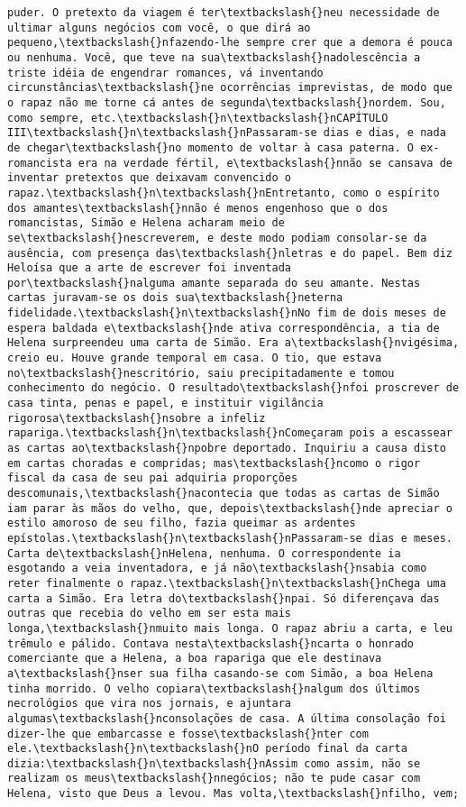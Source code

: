 \documentclass[11pt]{article}
\begin{document}
\begin{Verbatim}[commandchars=\\\{\}]
puder. O pretexto da viagem é ter\textbackslash{}neu necessidade de ultimar alguns negócios com você, o que dirá ao pequeno,\textbackslash{}nfazendo-lhe sempre crer que a demora é pouca ou nenhuma. Você, que teve na sua\textbackslash{}nadolescência a triste idéia de engendrar romances, vá inventando circunstâncias\textbackslash{}ne ocorrências imprevistas, de modo que o rapaz não me torne cá antes de segunda\textbackslash{}nordem. Sou, como sempre, etc.\textbackslash{}n\textbackslash{}nCAPÍTULO III\textbackslash{}n\textbackslash{}nPassaram-se dias e dias, e nada de chegar\textbackslash{}no momento de voltar à casa paterna. O ex-romancista era na verdade fértil, e\textbackslash{}nnão se cansava de inventar pretextos que deixavam convencido o rapaz.\textbackslash{}n\textbackslash{}nEntretanto, como o espírito dos amantes\textbackslash{}nnão é menos engenhoso que o dos romancistas, Simão e Helena acharam meio de se\textbackslash{}nescreverem, e deste modo podiam consolar-se da ausência, com presença das\textbackslash{}nletras e do papel. Bem diz Heloísa que a arte de escrever foi inventada por\textbackslash{}nalguma amante separada do seu amante. Nestas cartas juravam-se os dois sua\textbackslash{}neterna fidelidade.\textbackslash{}n\textbackslash{}nNo fim de dois meses de espera baldada e\textbackslash{}nde ativa correspondência, a tia de Helena surpreendeu uma carta de Simão. Era a\textbackslash{}nvigésima, creio eu. Houve grande temporal em casa. O tio, que estava no\textbackslash{}nescritório, saiu precipitadamente e tomou conhecimento do negócio. O resultado\textbackslash{}nfoi proscrever de casa tinta, penas e papel, e instituir vigilância rigorosa\textbackslash{}nsobre a infeliz rapariga.\textbackslash{}n\textbackslash{}nComeçaram pois a escassear as cartas ao\textbackslash{}npobre deportado. Inquiriu a causa disto em cartas choradas e compridas; mas\textbackslash{}ncomo o rigor fiscal da casa de seu pai adquiria proporções descomunais,\textbackslash{}nacontecia que todas as cartas de Simão iam parar às mãos do velho, que, depois\textbackslash{}nde apreciar o estilo amoroso de seu filho, fazia queimar as ardentes epístolas.\textbackslash{}n\textbackslash{}nPassaram-se dias e meses. Carta de\textbackslash{}nHelena, nenhuma. O correspondente ia esgotando a veia inventadora, e já não\textbackslash{}nsabia como reter finalmente o rapaz.\textbackslash{}n\textbackslash{}nChega uma carta a Simão. Era letra do\textbackslash{}npai. Só diferençava das outras que recebia do velho em ser esta mais longa,\textbackslash{}nmuito mais longa. O rapaz abriu a carta, e leu trêmulo e pálido. Contava nesta\textbackslash{}ncarta o honrado comerciante que a Helena, a boa rapariga que ele destinava a\textbackslash{}nser sua filha casando-se com Simão, a boa Helena tinha morrido. O velho copiara\textbackslash{}nalgum dos últimos necrológios que vira nos jornais, e ajuntara algumas\textbackslash{}nconsolações de casa. A última consolação foi dizer-lhe que embarcasse e fosse\textbackslash{}nter com ele.\textbackslash{}n\textbackslash{}nO período final da carta dizia:\textbackslash{}n\textbackslash{}nAssim como assim, não se realizam os meus\textbackslash{}nnegócios; não te pude casar com Helena, visto que Deus a levou. Mas volta,\textbackslash{}nfilho, vem; 
\end{Verbatim}
\end{document}
